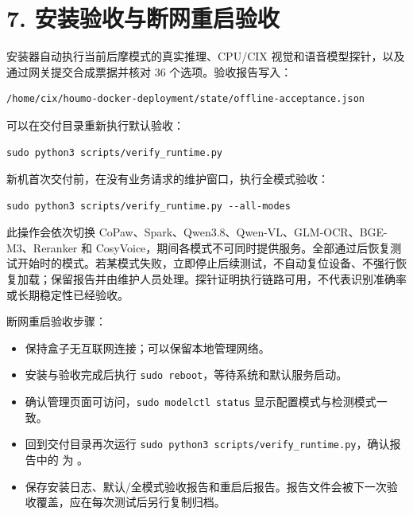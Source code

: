 \documentclass[UTF8,a4paper,zihao=-4,fontset=windows]{ctexart}
\begin{document}
\section*{7. 安装验收与断网重启验收}
安装器自动执行当前后摩模式的真实推理、CPU/CIX 视觉和语音模型探针，以及通过网关提交合成票据并核对 36 个选项。验收报告写入：\par
\par\noindent\begin{minipage}{\linewidth}\begin{lstlisting}
/home/cix/houmo-docker-deployment/state/offline-acceptance.json
\end{lstlisting}\end{minipage}\par
可以在交付目录重新执行默认验收：\par
\par\noindent\begin{minipage}{\linewidth}\begin{lstlisting}
sudo python3 scripts/verify_runtime.py
\end{lstlisting}\end{minipage}\par
新机首次交付前，在没有业务请求的维护窗口，执行全模式验收：\par
\par\noindent\begin{minipage}{\linewidth}\begin{lstlisting}
sudo python3 scripts/verify_runtime.py --all-modes
\end{lstlisting}\end{minipage}\par
此操作会依次切换 CoPaw、Spark、Qwen3.8、Qwen-VL、GLM-OCR、BGE-M3、Reranker 和 CosyVoice，期间各模式不可同时提供服务。全部通过后恢复测试开始时的模式。若某模式失败，立即停止后续测试，不自动复位设备、不强行恢复加载；保留报告并由维护人员处理。探针证明执行链路可用，不代表识别准确率或长期稳定性已经验收。\par
断网重启验收步骤：\par
\begin{itemize}
\item 保持盒子无互联网连接；可以保留本地管理网络。
\item 安装与验收完成后执行 \texttt{sudo reboot}，等待系统和默认服务启动。
\item 确认管理页面可访问，\texttt{sudo modelctl status} 显示配置模式与检测模式一致。
\item 回到交付目录再次运行 \texttt{sudo python3 scripts/verify\_runtime.py}，确认报告中的  为 。
\item 保存安装日志、默认/全模式验收报告和重启后报告。报告文件会被下一次验收覆盖，应在每次测试后另行复制归档。
\end{itemize}
\end{document}
